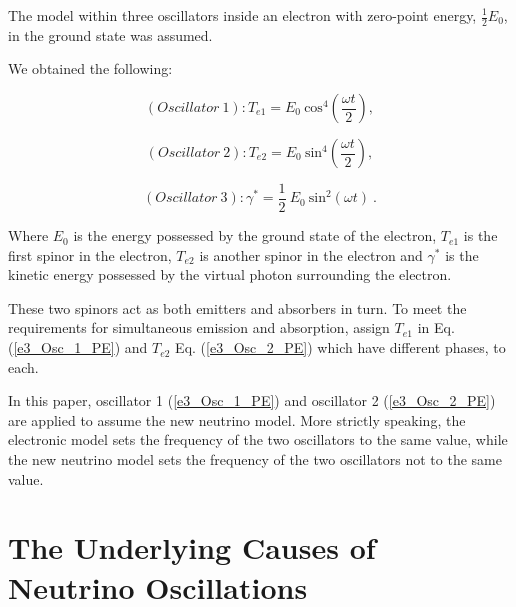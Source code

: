 \documentclass[%
 reprint,
 amsmath,amssymb,
 aps,
]{revtex4-1}
\numberwithin{equation}{section}%
\begin{document}
The model within three oscillators inside an electron with zero-point energy, $\frac{1}{2} E_0$, in the ground state was assumed.

We obtained the following:

        \begin{equation}
                (Oscillator \ 1): T_{e1} = E_{0}  \ \mathrm{cos}^{4} \left( \frac{\omega t}{2} \right)
                    ,
                \label{e3_Osc_1_PE}
        \end{equation}

        \begin{equation}
                (Oscillator \ 2): T_{e2} = E_{0}  \ \mathrm{sin}^{4} \left( \frac{\omega t}{2} \right)
                    ,
                \label{e3_Osc_2_PE}
        \end{equation}

        \begin{equation}
                (Oscillator \ 3):  \gamma^{*} = \frac{1}{2} \ E_{0} \ \mathrm{sin}^{2} (\omega t)
                    \ .
                \label{e3_Osc_3_KE}  
        \end{equation}

Where $E_0$ is the energy possessed by the ground state of the electron, $T_{e1}$ is the first spinor in the electron, $T_{e2}$ is another spinor in the electron and $\gamma^{*}$ is the kinetic energy possessed by the virtual photon surrounding the electron.

These two spinors act as both emitters and absorbers in turn. To meet the requirements for simultaneous emission and absorption, assign $T_{e1}$ in Eq. (\ref{e3_Osc_1_PE}) and $T_{e2}$ Eq. (\ref{e3_Osc_2_PE}) which have different phases, to each.

In this paper, oscillator 1 (\ref{e3_Osc_1_PE}) and oscillator 2 (\ref{e3_Osc_2_PE}) are applied to assume the new neutrino model. More strictly speaking, the electronic model sets the frequency of the two oscillators to the same value, while the new neutrino model sets the frequency of the two oscillators not to the same value.


\section{\label{sec:The Underlying Causes of Neutrino Oscillations}The Underlying Causes of Neutrino Oscillations}
\end{document}
